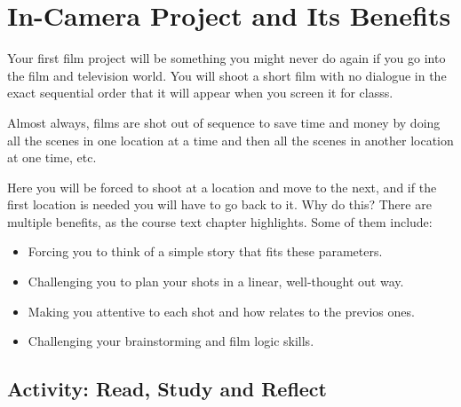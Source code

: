 \documentclass[
  letterpaper,
  DIV=11,
  numbers=noendperiod]{scrreprt}
\providecommand{\tightlist}{%
  \setlength{\itemsep}{0pt}\setlength{\parskip}{0pt}}\usepackage{longtable,booktabs,array}
\begin{document}
\section{In-Camera Project and Its
Benefits}\label{in-camera-project-and-its-benefits}

Your first film project will be something you might never do again if
you go into the film and television world. You will shoot a short film
with no dialogue in the exact sequential order that it will appear when
you screen it for classs.

Almost always, films are shot out of sequence to save time and money by
doing all the scenes in one location at a time and then all the scenes
in another location at one time, etc.

Here you will be forced to shoot at a location and move to the next, and
if the first location is needed you will have to go back to it. Why do
this? There are multiple benefits, as the course text chapter
highlights. Some of them include:

\begin{itemize}
\tightlist
\item
  Forcing you to think of a simple story that fits these parameters.
\item
  Challenging you to plan your shots in a linear, well-thought out way.
\item
  Making you attentive to each shot and how relates to the previos ones.
\item
  Challenging your brainstorming and film logic skills.
\end{itemize}

\subsection{Activity: Read, Study and
Reflect}\label{activity-read-study-and-reflect}
\end{document}
